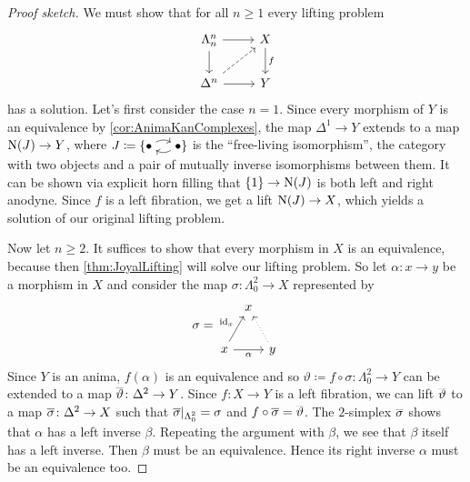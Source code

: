 \begin{proof}[Proof sketch]
	We must show that for all $n\geqslant1$ every lifting problem
	\begin{equation*}
		\begin{tikzcd}
			\Lambda_n^n\rar\dar & X\dar["f"]\\
			\Delta^n\rar\urar[dashed] & Y
		\end{tikzcd}
	\end{equation*}
	has a solution. Let's first consider the case $n=1$. Since every morphism of $Y$ is an equivalence by \cref{cor:AnimaKanComplexes}, the map $\Delta^1\rightarrow Y$ extends to a map $\operatorname{N}(J)\rightarrow Y$, where $J\coloneqq \{\InlineJ\}$ is the \enquote{free-living isomorphism}, the category with two objects and a pair of mutually inverse isomorphisms between them. It can be shown via explicit horn filling that $\{1\}\rightarrow \operatorname{N}(J)$ is both left and right anodyne. Since $f$ is a left fibration, we get a lift $\operatorname{N}(J)\rightarrow X$, which yields a solution of our original lifting problem.
	
	Now let $n\geqslant 2$. It suffices to show that every morphism in $X$ is an equivalence, because then \cref{thm:JoyalLifting} will solve our lifting problem. So let $\alpha\colon x\rightarrow y$ be a morphism in $X$ and consider the map $\sigma\colon\Lambda_0^2\rightarrow X$ represented by
	\begin{equation*}
		\sigma=\begin{tikzpicture}[commutative diagrams/every diagram,baseline=(mid.base)]
			\path node[outer sep=0.25ex] (0) at (0,0) {$x$} ++(0:3.8em) node[text depth=0pt,outer sep=0.25ex] (1) {$y$} ++ (120:3.8em) node[outer sep=0.25ex] (2) {$x$};
			\path (0) to node[pos=0.5] (mid) {} (2);
			\path[commutative diagrams/.cd, every arrow, every label]
			(0) edge node[swap] {$\alpha$} (1)
			(1) edge[dotted] (2)
			(0) edge node {$\id_x$} (2);
		\end{tikzpicture}
	\end{equation*}
	Since $Y$ is an anima, $f(\alpha)$ is an equivalence and so $\vartheta\coloneqq f\circ\sigma \colon \Lambda_0^2\rightarrow Y$ can be extended to a map $\ov\vartheta\colon \Delta^2\rightarrow Y$. Since $f\colon X\rightarrow Y$ is a left fibration, we can lift $\ov\vartheta$ to a map $\ov\sigma\colon \Delta^2\rightarrow X$ such that $\ov\sigma|_{\Lambda_0^2}=\sigma$ and $f\circ \ov\sigma=\ov\vartheta$. The $2$-simplex $\ov\sigma$ shows that $\alpha$ has a left inverse $\beta$. Repeating the argument with $\beta$, we see that $\beta$ itself has a left inverse. Then $\beta$ must be an equivalence. Hence its right inverse $\alpha$ must be an equivalence too. 
\end{proof}
